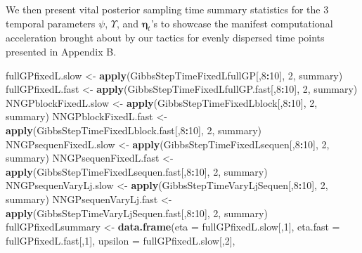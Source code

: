 \documentclass[
]{article}
\newenvironment{Shaded}{\begin{snugshade}}{\end{snugshade}}
\newcommand{\AttributeTok}[1]{\textcolor[rgb]{0.13,0.29,0.53}{#1}}
\newcommand{\DecValTok}[1]{\textcolor[rgb]{0.00,0.00,0.81}{#1}}
\newcommand{\FunctionTok}[1]{\textcolor[rgb]{0.13,0.29,0.53}{\textbf{#1}}}
\newcommand{\NormalTok}[1]{#1}
\newcommand{\OtherTok}[1]{\textcolor[rgb]{0.56,0.35,0.01}{#1}}
\newcommand{\SpecialCharTok}[1]{\textcolor[rgb]{0.81,0.36,0.00}{\textbf{#1}}}
\begin{document}
We then present vital posterior sampling time summary statistics for the
3 temporal parameters \(\psi\), \(\Upsilon\), and \(\bm{\eta}_t\)'s to
showcase the manifest computational acceleration brought about by our
tactics for evenly dispersed time points presented in Appendix B.

\begin{Shaded}
\begin{Highlighting}[]
\NormalTok{fullGPfixedL.slow }\OtherTok{\textless{}{-}} \FunctionTok{apply}\NormalTok{(GibbsStepTimeFixedLfullGP[,}\DecValTok{8}\SpecialCharTok{:}\DecValTok{10}\NormalTok{], }\DecValTok{2}\NormalTok{, summary)      }
\NormalTok{fullGPfixedL.fast }\OtherTok{\textless{}{-}} \FunctionTok{apply}\NormalTok{(GibbsStepTimeFixedLfullGP.fast[,}\DecValTok{8}\SpecialCharTok{:}\DecValTok{10}\NormalTok{], }\DecValTok{2}\NormalTok{, summary) }
\NormalTok{NNGPblockFixedL.slow }\OtherTok{\textless{}{-}} \FunctionTok{apply}\NormalTok{(GibbsStepTimeFixedLblock[,}\DecValTok{8}\SpecialCharTok{:}\DecValTok{10}\NormalTok{], }\DecValTok{2}\NormalTok{, summary)       }
\NormalTok{NNGPblockFixedL.fast }\OtherTok{\textless{}{-}} \FunctionTok{apply}\NormalTok{(GibbsStepTimeFixedLblock.fast[,}\DecValTok{8}\SpecialCharTok{:}\DecValTok{10}\NormalTok{], }\DecValTok{2}\NormalTok{, summary)  }
\NormalTok{NNGPsequenFixedL.slow }\OtherTok{\textless{}{-}} \FunctionTok{apply}\NormalTok{(GibbsStepTimeFixedLsequen[,}\DecValTok{8}\SpecialCharTok{:}\DecValTok{10}\NormalTok{], }\DecValTok{2}\NormalTok{, summary)     }
\NormalTok{NNGPsequenFixedL.fast }\OtherTok{\textless{}{-}} \FunctionTok{apply}\NormalTok{(GibbsStepTimeFixedLsequen.fast[,}\DecValTok{8}\SpecialCharTok{:}\DecValTok{10}\NormalTok{], }\DecValTok{2}\NormalTok{, summary) }
\NormalTok{NNGPsequenVaryLj.slow }\OtherTok{\textless{}{-}} \FunctionTok{apply}\NormalTok{(GibbsStepTimeVaryLjSequen[,}\DecValTok{8}\SpecialCharTok{:}\DecValTok{10}\NormalTok{], }\DecValTok{2}\NormalTok{, summary)      }
\NormalTok{NNGPsequenVaryLj.fast }\OtherTok{\textless{}{-}} \FunctionTok{apply}\NormalTok{(GibbsStepTimeVaryLjSequen.fast[,}\DecValTok{8}\SpecialCharTok{:}\DecValTok{10}\NormalTok{], }\DecValTok{2}\NormalTok{, summary) }
\NormalTok{fullGPfixedLsummary }\OtherTok{\textless{}{-}} \FunctionTok{data.frame}\NormalTok{(}\AttributeTok{eta =}\NormalTok{ fullGPfixedL.slow[,}\DecValTok{1}\NormalTok{], }
                                  \AttributeTok{eta.fast =}\NormalTok{ fullGPfixedL.fast[,}\DecValTok{1}\NormalTok{],}
                                  \AttributeTok{upsilon =}\NormalTok{ fullGPfixedL.slow[,}\DecValTok{2}\NormalTok{], }

\end{Highlighting}
\end{Shaded}
\end{document}
